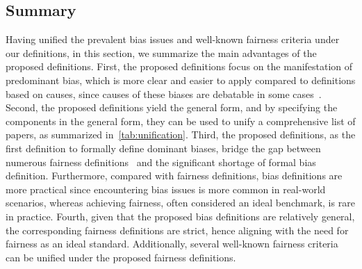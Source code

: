 \subsection{Summary}

Having unified the prevalent bias issues and well-known fairness criteria under our definitions, in this section, we summarize the main advantages of the proposed definitions.
First, the proposed definitions focus on the manifestation of predominant bias, which is more clear and easier to apply compared to definitions based on causes, since causes of these biases are debatable in some cases~\cite{BR_Net_dataset_vs_task, minority_group_vs_sensitive_attribute,RL_RBN}.
Second, the proposed definitions yield the general form, and by specifying the components in the general form, they can be used to unify a comprehensive list of papers, as summarized in~\cref{tab:unification}. 
Third, the proposed definitions, as the first definition to formally define dominant biases, bridge the gap between numerous fairness definitions~\cite{EO_define,counterfactual_fairness,fairness_through_awareness,fairness_under_unawareness,process_fairness_FPR_difference,impossibility_for_fair_repesentations,Accuracy_parity} and the significant shortage of formal bias definition.
Furthermore, compared with fairness definitions, bias definitions are more practical since encountering bias issues is more common in real-world scenarios, whereas achieving fairness, often considered an ideal benchmark, is rare in practice.
Fourth, given that the proposed bias definitions are relatively general, the corresponding fairness definitions are strict, hence aligning with the need for fairness as an ideal standard. 
Additionally, several well-known fairness criteria can be unified under the proposed fairness definitions.








